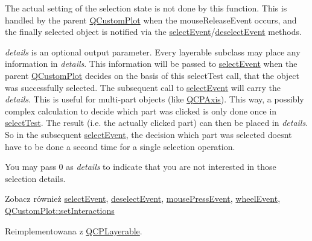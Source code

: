 The actual setting of the selection state is not done by this function. This is handled by the parent \hyperlink{class_q_custom_plot}{Q\+Custom\+Plot} when the mouse\+Release\+Event occurs, and the finally selected object is notified via the \hyperlink{class_q_c_p_abstract_plottable_a2d488568cf16600dd81fa23d7d439829}{select\+Event}/\hyperlink{class_q_c_p_abstract_plottable_a9b104d9da4f38f934363945c313bf82e}{deselect\+Event} methods.

{\itshape details} is an optional output parameter. Every layerable subclass may place any information in {\itshape details}. This information will be passed to \hyperlink{class_q_c_p_abstract_plottable_a2d488568cf16600dd81fa23d7d439829}{select\+Event} when the parent \hyperlink{class_q_custom_plot}{Q\+Custom\+Plot} decides on the basis of this select\+Test call, that the object was successfully selected. The subsequent call to \hyperlink{class_q_c_p_abstract_plottable_a2d488568cf16600dd81fa23d7d439829}{select\+Event} will carry the {\itshape details}. This is useful for multi-\/part objects (like \hyperlink{class_q_c_p_axis}{Q\+C\+P\+Axis}). This way, a possibly complex calculation to decide which part was clicked is only done once in \hyperlink{class_q_c_p_abstract_plottable_a38efe9641d972992a3d44204bc80ec1d}{select\+Test}. The result (i.\+e. the actually clicked part) can then be placed in {\itshape details}. So in the subsequent \hyperlink{class_q_c_p_abstract_plottable_a2d488568cf16600dd81fa23d7d439829}{select\+Event}, the decision which part was selected doesn\textquotesingle{}t have to be done a second time for a single selection operation.

You may pass 0 as {\itshape details} to indicate that you are not interested in those selection details.

\begin{DoxySeeAlso}{Zobacz również}
\hyperlink{class_q_c_p_abstract_plottable_a2d488568cf16600dd81fa23d7d439829}{select\+Event}, \hyperlink{class_q_c_p_abstract_plottable_a9b104d9da4f38f934363945c313bf82e}{deselect\+Event}, \hyperlink{class_q_c_p_layerable_af6567604818db90f4fd52822f8bc8376}{mouse\+Press\+Event}, \hyperlink{class_q_c_p_layerable_a47dfd7b8fd99c08ca54e09c362b6f022}{wheel\+Event}, \hyperlink{class_q_custom_plot_a5ee1e2f6ae27419deca53e75907c27e5}{Q\+Custom\+Plot\+::set\+Interactions} 
\end{DoxySeeAlso}


Reimplementowana z \hyperlink{class_q_c_p_layerable_a4001c4d0dfec55598efa4d531f2179a9}{Q\+C\+P\+Layerable}.



